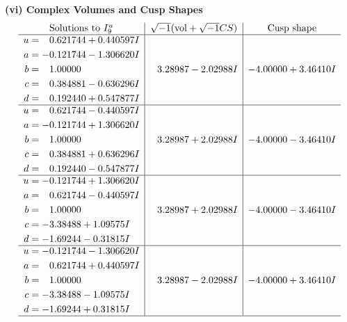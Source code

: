 \documentclass[1p]{elsarticle_modified}
\theoremstyle{definition}
\newcommand{\I}{\sqrt{-1}}
\begin{document}
\newpage\flushleft \textbf{(vi) Complex Volumes and Cusp Shapes}
$$\begin{array}{c|c|c}  
\text{Solutions to }I^u_{9}& \I (\text{vol} + \sqrt{-1}CS) & \text{Cusp shape}\\
 \hline 
\begin{aligned}
u &= \phantom{-}0.621744 + 0.440597 I \\
a &= -0.121744 - 1.306620 I \\
b &= \phantom{-}1.00000\phantom{ +0.000000I} \\
c &= \phantom{-}0.384881 - 0.636296 I \\
d &= \phantom{-}0.192440 + 0.547877 I\end{aligned}
 & \phantom{-}3.28987 - 2.02988 I & -4.00000 + 3.46410 I \\ \hline\begin{aligned}
u &= \phantom{-}0.621744 - 0.440597 I \\
a &= -0.121744 + 1.306620 I \\
b &= \phantom{-}1.00000\phantom{ +0.000000I} \\
c &= \phantom{-}0.384881 + 0.636296 I \\
d &= \phantom{-}0.192440 - 0.547877 I\end{aligned}
 & \phantom{-}3.28987 + 2.02988 I & -4.00000 - 3.46410 I \\ \hline\begin{aligned}
u &= -0.121744 + 1.306620 I \\
a &= \phantom{-}0.621744 - 0.440597 I \\
b &= \phantom{-}1.00000\phantom{ +0.000000I} \\
c &= -3.38488 + 1.09575 I \\
d &= -1.69244 - 0.31815 I\end{aligned}
 & \phantom{-}3.28987 + 2.02988 I & -4.00000 - 3.46410 I \\ \hline\begin{aligned}
u &= -0.121744 - 1.306620 I \\
a &= \phantom{-}0.621744 + 0.440597 I \\
b &= \phantom{-}1.00000\phantom{ +0.000000I} \\
c &= -3.38488 - 1.09575 I \\
d &= -1.69244 + 0.31815 I\end{aligned}
 & \phantom{-}3.28987 - 2.02988 I & -4.00000 + 3.46410 I\\
 \hline 
 \end{array}$$\newpage\newpage\renewcommand{\arraystretch}{1}
\end{document}
